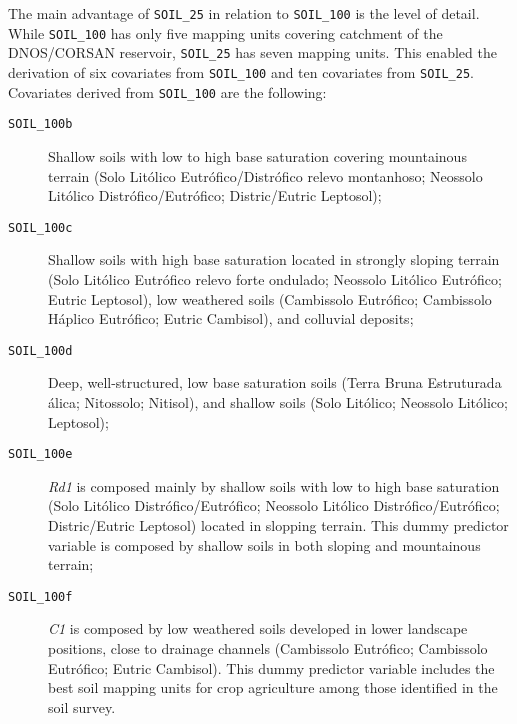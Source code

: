 The main advantage of \texttt{SOIL\_25} in relation to \texttt{SOIL\_100} is the level of detail. 
While \texttt{SOIL\_100} has only five mapping units covering catchment of the DNOS/CORSAN 
reservoir, \texttt{SOIL\_25} has seven mapping units. This enabled the derivation of six 
covariates from \texttt{SOIL\_100} and ten covariates from \texttt{SOIL\_25}. Covariates derived 
from \texttt{SOIL\_100} are the following:

\begin{description}
  
 \item[\texttt{SOIL\_100b}] Shallow soils with low to high base saturation covering mountainous 
 terrain (Solo Litólico Eutrófico/Distrófico relevo montanhoso; Neossolo Litólico 
 Distrófico/Eutrófico; Distric/Eutric Leptosol);
  
 \item[\texttt{SOIL\_100c}] Shallow soils with high base saturation located in strongly sloping 
 terrain (Solo Litólico Eutrófico relevo forte ondulado; Neossolo Litólico Eutrófico; Eutric 
 Leptosol), low weathered soils (Cambissolo Eutrófico; Cambissolo Háplico Eutrófico; Eutric 
 Cambisol), and colluvial deposits;
  
 \item[\texttt{SOIL\_100d}] Deep, well-structured, low base saturation soils (Terra Bruna 
 Estruturada álica; Nitossolo; Nitisol), and shallow soils (Solo Litólico; Neossolo Litólico; 
 Leptosol);
  
 \item[\texttt{SOIL\_100e}] \textit{Rd1} is composed mainly by shallow soils with low to high base 
 saturation (Solo Litólico Distrófico/Eutrófico; Neossolo Litólico Distrófico/Eutrófico; 
 Distric/Eutric Leptosol) located in slopping terrain. This dummy predictor variable is composed by 
 shallow soils in both sloping and mountainous terrain;
  
 \item[\texttt{SOIL\_100f}] \textit{C1} is composed by low weathered soils developed in lower 
 landscape positions, close to drainage channels (Cambissolo Eutrófico; Cambissolo Eutrófico; 
 Eutric Cambisol). This dummy predictor variable includes the best soil mapping units for crop 
 agriculture among those identified in the soil survey.
\end{description}

